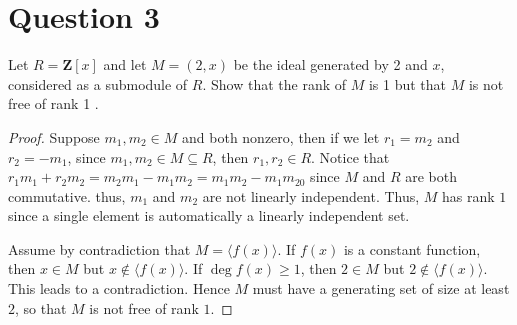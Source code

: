 \section{Question 3}

\begin{question}
    Let $R=\mathbf{Z}[x]$ and let $M=(2, x)$ be the ideal generated by 2 and $x$, considered as a submodule of $R$. Show that the rank of $M$ is 1 but that $M$ is not free of rank 1 .
\end{question}

\begin{answer}
    \begin{proof}
        Suppose $m_1,m_2 \in M$ and both nonzero, then if we let $r_1 = m_2$ and $r_2 = -m_1$, since $m_1,m_2 \in M \subseteq R$, then $r_1,r_2 \in R$. Notice that $r_1m_1+r_2m_2 = m_2m_1-m_1m_2 = m_1m_2-m_1m_20$ since $M$ and $R$ are both commutative. thus, $m_1$ and $m_2$ are not linearly independent. Thus, $M$ has rank $1$ since a single element is automatically a linearly independent set.
        
        Assume by contradiction that $M = \langle f(x) \rangle$. If $f(x)$ is a constant function, then $x \in M$ but $x \notin \langle f(x) \rangle$. If $\deg f(x) \geq 1$, then $2 \in M$ but $2 \notin \langle f(x) \rangle$. This leads to a contradiction. Hence $M$ must have a generating set of size at least $2$, so that $M$ is not free of rank $1$.
    \end{proof}
\end{answer}